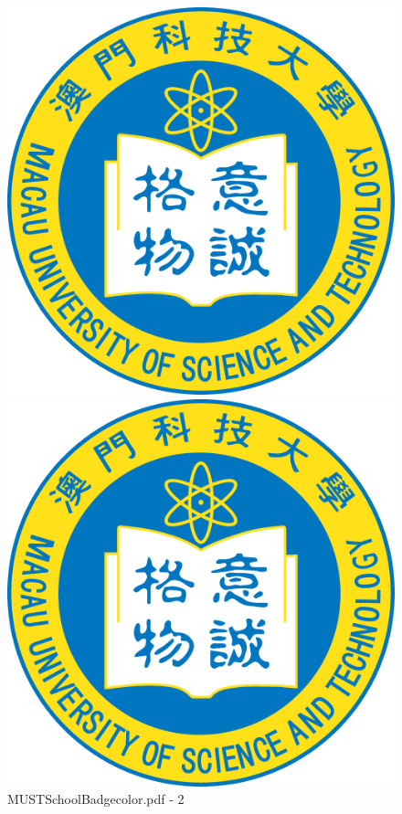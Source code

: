 \documentclass[12pt, a4paper]{report}
\begin{document}
\begin{figure}[!htbp]
\begin{minipage}[t]{0.5\linewidth}
	\end{minipage}
	\begin{minipage}[t]{0.5\linewidth}
		\centering
		\includegraphics[width=\textwidth]{figure/MUSTSchoolBadgecolor.pdf}
	\end{minipage}
    \begin{minipage}[t]{0.5\linewidth}
		\centering
		\includegraphics[width=\textwidth]{figure/MUSTSchoolBadgecolor.pdf}
	\end{minipage}
	\caption{MUSTSchoolBadgecolor.pdf - 2 }
	\label{fig:MUST2}
\end{figure}
\end{document}
